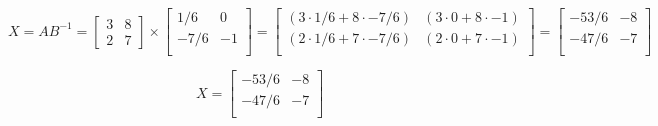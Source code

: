 $$
X = AB^{-1} = \begin{bmatrix}
  3 & 8 \\
  2 & 7
\end{bmatrix} \times \begin{bmatrix}
   1/6 &  0 \\
  -7/6 & -1 \\
\end{bmatrix} = \begin{bmatrix}
  (3 \cdot 1/6 + 8 \cdot -7/6) & (3 \cdot 0 + 8 \cdot -1 ) \\
  (2 \cdot 1/6 + 7 \cdot -7/6 ) & (2 \cdot 0 + 7 \cdot -1 ) \\
\end{bmatrix} = \begin{bmatrix}
  -53/6 & -8  \\
  -47/6 & -7 \\
\end{bmatrix}
$$

$$
\boxed{
X = \begin{bmatrix}
  -53/6 & -8  \\
  -47/6 & -7 \\
\end{bmatrix}}
$$
